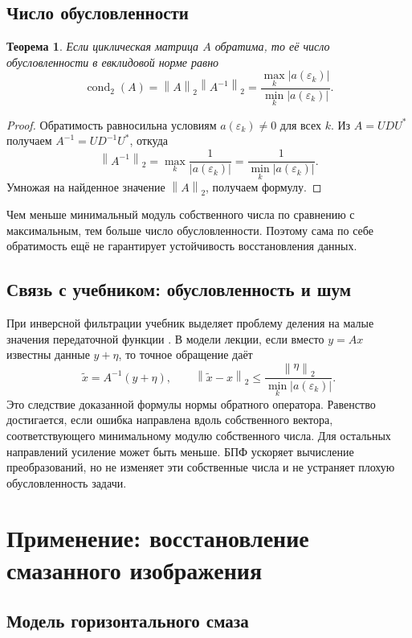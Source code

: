 \documentclass[12pt,a4paper]{article}
\newtheorem{theorem}{Теорема}
\theoremstyle{definition}
\theoremstyle{remark}
\DeclareMathOperator{\cond}{cond}
\newcommand{\eps}{\varepsilon}
\newcommand{\norm}[1]{\left\lVert #1\right\rVert}
\begin{document}
\subsection{Число обусловленности}

\begin{theorem}
Если циклическая матрица $A$ обратима, то её число обусловленности в
евклидовой норме равно
\[
  \boxed{\cond_2(A)=\norm{A}_2\norm{A^{-1}}_2
  =\frac{\max_k|a(\eps_k)|}{\min_k|a(\eps_k)|}}.
\]
\end{theorem}

\begin{proof}
Обратимость равносильна условиям $a(\eps_k)\ne0$ для всех $k$.
Из $A=UDU^*$ получаем $A^{-1}=UD^{-1}U^*$, откуда
\[
  \norm{A^{-1}}_2
  =\max_k\frac1{|a(\eps_k)|}
  =\frac1{\min_k|a(\eps_k)|}.
\]
Умножая на найденное значение $\norm{A}_2$, получаем формулу.
\end{proof}

Чем меньше минимальный модуль собственного числа по сравнению с
максимальным, тем больше число обусловленности. Поэтому сама по себе
обратимость ещё не гарантирует устойчивость восстановления данных.

\subsection{Связь с учебником: обусловленность и шум}

При инверсной фильтрации учебник выделяет проблему деления
на малые значения передаточной функции
\cite[\S\,5.7, с.~412]{GW2012}.
В модели лекции, если вместо $y=Ax$ известны данные $y+\eta$,
то точное обращение даёт
\[
  \widetilde x=A^{-1}(y+\eta),\qquad
  \norm{\widetilde x-x}_2
  \leqslant\frac{\norm{\eta}_2}{\min_k|a(\eps_k)|}.
\]
Это следствие доказанной формулы нормы обратного оператора.
Равенство достигается, если ошибка направлена вдоль собственного
вектора, соответствующего минимальному модулю собственного числа.
Для остальных направлений усиление может быть меньше.
БПФ ускоряет вычисление преобразований, но не изменяет эти
собственные числа и не устраняет плохую обусловленность задачи.

\section{Применение: восстановление смазанного изображения}

\subsection{Модель горизонтального смаза}
\end{document}
